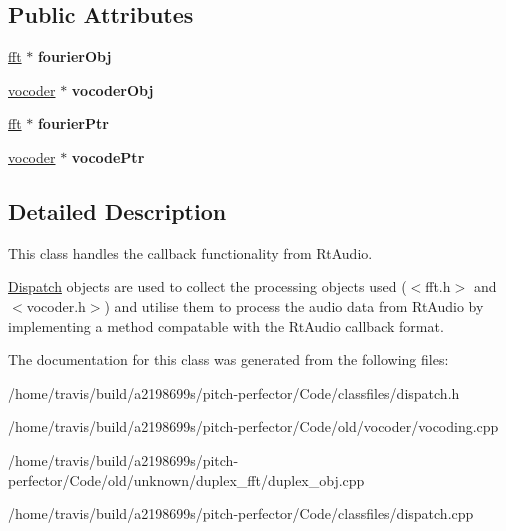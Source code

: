 \subsection*{Public Attributes}
\begin{DoxyCompactItemize}
\item 
\hypertarget{classdispatch_a7b449abb93c0499530bec56afe866f5a}{\hyperlink{classfft}{fft} $\ast$ {\bfseries fourier\-Obj}}\label{classdispatch_a7b449abb93c0499530bec56afe866f5a}

\item 
\hypertarget{classdispatch_a7ccec21b2dce1224744ccaa8d1cafee5}{\hyperlink{classvocoder}{vocoder} $\ast$ {\bfseries vocoder\-Obj}}\label{classdispatch_a7ccec21b2dce1224744ccaa8d1cafee5}

\item 
\hypertarget{classdispatch_a25afc54bd990f1169d9fa75dc304793b}{\hyperlink{classfft}{fft} $\ast$ {\bfseries fourier\-Ptr}}\label{classdispatch_a25afc54bd990f1169d9fa75dc304793b}

\item 
\hypertarget{classdispatch_adf89bdb854ef17a8927bf7c506bfdc23}{\hyperlink{classvocoder}{vocoder} $\ast$ {\bfseries vocode\-Ptr}}\label{classdispatch_adf89bdb854ef17a8927bf7c506bfdc23}

\end{DoxyCompactItemize}


\subsection{Detailed Description}
This class handles the callback functionality from Rt\-Audio. 

\hyperlink{classDispatch}{Dispatch} objects are used to collect the processing objects used ($<$fft.\-h$>$ and $<$vocoder.\-h$>$) and utilise them to process the audio data from Rt\-Audio by implementing a method compatable with the Rt\-Audio callback format. 

The documentation for this class was generated from the following files\-:\begin{DoxyCompactItemize}
\item 
/home/travis/build/a2198699s/pitch-\/perfector/\-Code/classfiles/dispatch.\-h\item 
/home/travis/build/a2198699s/pitch-\/perfector/\-Code/old/vocoder/vocoding.\-cpp\item 
/home/travis/build/a2198699s/pitch-\/perfector/\-Code/old/unknown/duplex\-\_\-fft/duplex\-\_\-obj.\-cpp\item 
/home/travis/build/a2198699s/pitch-\/perfector/\-Code/classfiles/dispatch.\-cpp\end{DoxyCompactItemize}
